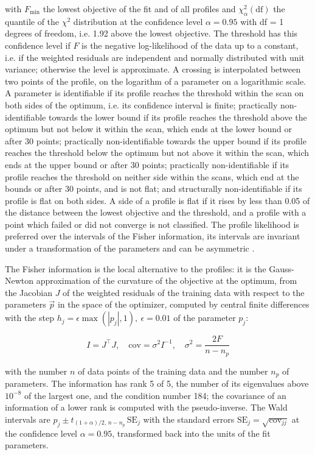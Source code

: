 \documentclass{article}
\begin{document}
with $F_{\min}$ the lowest objective of the fit and of all profiles and $\chi^2_{\alpha}(\mathrm{df})$ the quantile of the $\chi^2$ distribution at the confidence level $\alpha = 0.95$ with df = 1 degrees of freedom, i.e. 1.92 above the lowest objective. The threshold has this confidence level if $F$ is the negative log-likelihood of the data up to a constant, i.e. if the weighted residuals are independent and normally distributed with unit variance; otherwise the level is approximate. A crossing is interpolated between two points of the profile, on the logarithm of a parameter on a logarithmic scale. A parameter is identifiable if its profile reaches the threshold within the scan on both sides of the optimum, i.e. its confidence interval is finite; practically non-identifiable towards the lower bound if its profile reaches the threshold above the optimum but not below it within the scan, which ends at the lower bound or after 30 points; practically non-identifiable towards the upper bound if its profile reaches the threshold below the optimum but not above it within the scan, which ends at the upper bound or after 30 points; practically non-identifiable if its profile reaches the threshold on neither side within the scans, which end at the bounds or after 30 points, and is not flat; and structurally non-identifiable if its profile is flat on both sides. A side of a profile is flat if it rises by less than 0.05 of the distance between the lowest objective and the threshold, and a profile with a point which failed or did not converge is not classified. The profile likelihood is preferred over the intervals of the Fisher information, its intervals are invariant under a transformation of the parameters and can be asymmetric \cite{Wieland2021}.

The Fisher information is the local alternative to the profiles: it is the Gauss-Newton approximation of the curvature of the objective at the optimum, from the Jacobian $J$ of the weighted residuals of the training data with respect to the parameters $\vec{p}$ in the space of the optimizer, computed by central finite differences with the step $h_j = \epsilon \max(|p_j|, 1),\ \epsilon = 0.01$ of the parameter $p_j$:

\begin{equation}
I = J^\top J, \quad \mathrm{cov} = \sigma^2 I^{-1}, \quad \sigma^2 = \frac{2 F}{n - n_p}
\end{equation}

with the number $n$ of data points of the training data and the number $n_p$ of parameters. The information has rank 5 of 5, the number of its eigenvalues above $10^{-8}$ of the largest one, and the condition number 184; the covariance of an information of a lower rank is computed with the pseudo-inverse. The Wald intervals are $\hat{p}_j \pm t_{(1+\alpha)/2,\, n-n_p}\, \mathrm{SE}_j$ with the standard errors $\mathrm{SE}_j = \sqrt{\mathrm{cov}_{jj}}$ at the confidence level $\alpha = 0.95$, transformed back into the units of the fit parameters.
\end{document}
